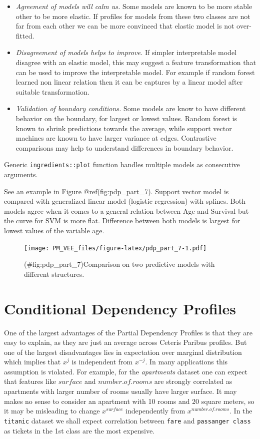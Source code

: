 \documentclass[12pt,]{krantz}
\providecommand{\tightlist}{%
  \setlength{\itemsep}{0pt}\setlength{\parskip}{0pt}}
\begin{document}
\begin{itemize}
\tightlist
\item
  \emph{Agreement of models will calm us.} Some models are known to be more stable other to be more elastic. If profiles for models from these two classes are not far from each other we can be more convinced that elastic model is not over-fitted.
\item
  \emph{Disagreement of models helps to improve.} If simpler interpretable model disagree with an elastic model, this may suggest a feature transformation that can be used to improve the interpretable model. For example if random forest learned non linear relation then it can be captures by a linear model after suitable transformation.
\item
  \emph{Validation of boundary conditions.} Some models are know to have different behavior on the boundary, for largest or lowest values. Random forest is known to shrink predictions towards the average, while support vector machines are known to have larger variance at edges. Contrastive comparisons may help to understand differences in boundary behavior.
\end{itemize}

Generic \texttt{ingredients::plot} function handles multiple models as consecutive arguments.

See an example in Figure @ref(fig:pdp\_part\_7). Support vector model is compared with generalized linear model (logistic regression) with splines. Both models agree when it comes to a general relation between Age and Survival but the curve for SVM is more flat. Difference between both models is largest for lowest values of the variable age.

\begin{figure}
\centering
\texttt{[image: PM\_VEE\_files/figure-latex/pdp\_part\_7-1.pdf]}
\caption{(\#fig:pdp\_part\_7)Comparison on two predictive models with different structures.}
\end{figure}

\hypertarget{conditionalProfiles}{%
\section{Conditional Dependency Profiles}\label{conditionalProfiles}}

One of the largest advantages of the Partial Dependency Profiles is that they are easy to explain, as they are just an average across Ceteris Paribus profiles. But one of the largest disadvantages lies in expectation over marginal distribution which implies that \(x^j\) is independent from \(x^{-j}\). In many applications this assumption is violated. For example, for the \emph{apartments} dataset one can expect that features like \(surface\) and \(number.of.rooms\) are strongly correlated as apartments with larger number of rooms usually have larger surface. It may makes no sense to consider an apartment with 10 rooms and 20 square meters, so it may be misleading to change \(x^{surface}\) independently from \(x^{number.of.rooms}\). In the \texttt{titanic} dataset we shall expect correlation between \texttt{fare} and \texttt{passanger\ class} as tickets in the 1st class are the most expensive.
\end{document}
